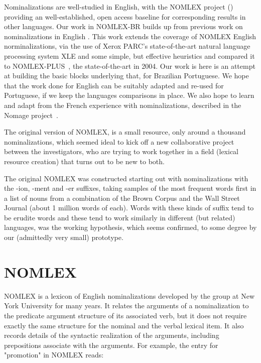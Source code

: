 \documentclass{article}
\begin{document}
Nominalizations are well-studied in English, with the NOMLEX project
(\cite{nomlex98}) providing an well-established, open access baseline
for corresponding results in other languages. Our work in NOMLEX-BR
builds up from previous work on nominalizations in English
\cite{flairs2006}. This work extends the coverage of NOMLEX English
norminalizations, via the use of Xerox PARC's state-of-the-art natural
language processing system XLE \cite{xle} and some simple, but
effective heuristics and compared it to NOMLEX-PLUS~\cite{nomlexplus},
the state-of-the-art in 2004. Our work is here is an attempt at
building the basic blocks underlying that, for Brazilian Portuguese.
We hope that the work done for English can be suitably adapted and
re-used for Portuguese, if we keep the languages comparisons in place.
We also hope to learn and adapt from the French experience with
nominalizations, described in the Nomage project~\cite{frenchnomlex}.

The original version of NOMLEX, is a small resource, only around a
thousand nominalizations, which seemed ideal to kick off a new
collaborative project between the investigators, who are trying to
work together in a field (lexical resource creation) that turns out to
be new to both.

The original NOMLEX was constructed starting out with nominalizations
with the -ion, -ment and -er suffixes, taking samples of the most
frequent words first in a list of nouns from a combination of the
Brown Corpus and the Wall Street Journal (about 1 million words of
each). Words with these kinds of suffix tend to be erudite words and
these tend to work similarly in different (but related) languages, was
the working hypothesis, which seems confirmed, to some degree by our
(admittedly very small) prototype.

\section{NOMLEX}\label{nomlex}

NOMLEX is a lexicon of English nominalizations developed by the group
at New York University for many years. It relates the arguments of a
nominalization to the predicate argument structure of its associated
verb, but it does not require exactly the same structure for the
nominal and the verbal lexical item. It also records details of the
syntactic realization of the arguments, including prepositions
associate with the arguments. For example, the entry for "promotion"
in NOMLEX reads:
\end{document}
